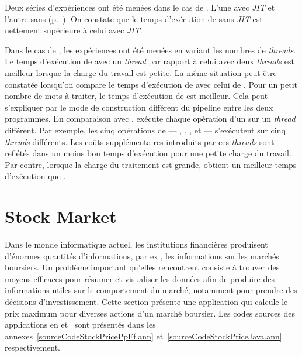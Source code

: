 Deux s\'eries d'exp\'eriences ont \'et\'e men\'ees dans le cas de . L'une avec \emph{JIT} et l'autre sans (p.~\pageref{jitDescription.sect}). On constate que le temps d'ex\'ecution de  sans \emph{JIT} est nettement sup\'erieure \`a celui avec \emph{JIT}.

Dans le cas de , les exp\'eriences ont \'et\'e men\'ees en variant les nombres de \emph{threads}. Le temps d'ex\'ecution de  avec un \emph{thread} par rapport \`a celui avec deux \emph{threads} est meilleur lorsque la charge du travail est petite. La m\^eme situation peut \^etre constat\'ee lorsqu'on compare le temps d'ex\'ecution de  avec celui de . Pour un petit nombre de mots \`a traiter, le temps d'ex\'ecution de  est meilleur. Cela peut s'expliquer par le mode de construction diff\'erent du pipeline entre les deux programmes. En comparaison avec ,  ex\'ecute chaque op\'eration d'un  sur un \emph{thread} diff\'erent. Par exemple, les cinq op\'erations de  --- , , ,  et  --- s'ex\'ecutent sur cinq \emph{threads} diff\'erents. Les co\^uts suppl\'ementaires introduits par ces \emph{threads} sont refl\'et\'es dans un moins bon temps d'ex\'ecution pour une petite charge du travail. Par contre, lorsque la charge du traitement est grande,  obtient un meilleur temps d'ex\'ecution que .



\section{Stock Market}
\label{stockprice.sect}


Dans le monde informatique actuel, les institutions financi\`eres produisent d'\'enormes quantit\'es d'informations, par ex., les informations sur les march\'es boursiers. Un probl\`eme important qu'elles rencontrent consiste \`a trouver des moyens efficaces pour r\'esumer et visualiser les donn\'ees afin de produire des informations utiles sur le comportement du march\'e, notamment pour prendre des d\'ecisions d'investissement. Cette section pr\'esente une application qui calcule le prix maximum pour diverses actions d'un marché boursier. Les codes sources des applications  en  et~ sont pr\'esent\'es dans les annexes~\ref{sourceCodeStockPricePpFf.ann} et~\ref{sourceCodeStockPriceJava.ann} respectivement. 

